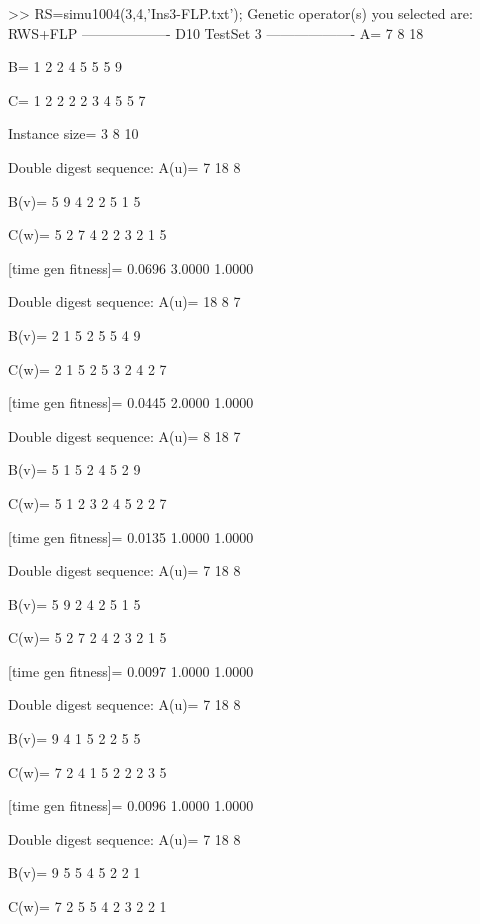 >> RS=simu1004(3,4,'Ins3-FLP.txt');
Genetic operator(s) you selected are:
RWS+FLP
------------------- D10 TestSet 3 -------------------
A=
     7     8    18

B=
     1     2     2     4     5     5     5     9

C=
     1     2     2     2     2     3     4     5     5     7

Instance size=
     3     8    10

Double digest sequence:
A(u)=
     7    18     8

B(v)=
     5     9     4     2     2     5     1     5

C(w)=
     5     2     7     4     2     2     3     2     1     5

[time gen fitness]=
    0.0696    3.0000    1.0000

Double digest sequence:
A(u)=
    18     8     7

B(v)=
     2     1     5     2     5     5     4     9

C(w)=
     2     1     5     2     5     3     2     4     2     7

[time gen fitness]=
    0.0445    2.0000    1.0000

Double digest sequence:
A(u)=
     8    18     7

B(v)=
     5     1     5     2     4     5     2     9

C(w)=
     5     1     2     3     2     4     5     2     2     7

[time gen fitness]=
    0.0135    1.0000    1.0000

Double digest sequence:
A(u)=
     7    18     8

B(v)=
     5     9     2     4     2     5     1     5

C(w)=
     5     2     7     2     4     2     3     2     1     5

[time gen fitness]=
    0.0097    1.0000    1.0000

Double digest sequence:
A(u)=
     7    18     8

B(v)=
     9     4     1     5     2     2     5     5

C(w)=
     7     2     4     1     5     2     2     2     3     5

[time gen fitness]=
    0.0096    1.0000    1.0000

Double digest sequence:
A(u)=
     7    18     8

B(v)=
     9     5     5     4     5     2     2     1

C(w)=
     7     2     5     5     4     2     3     2     2     1

